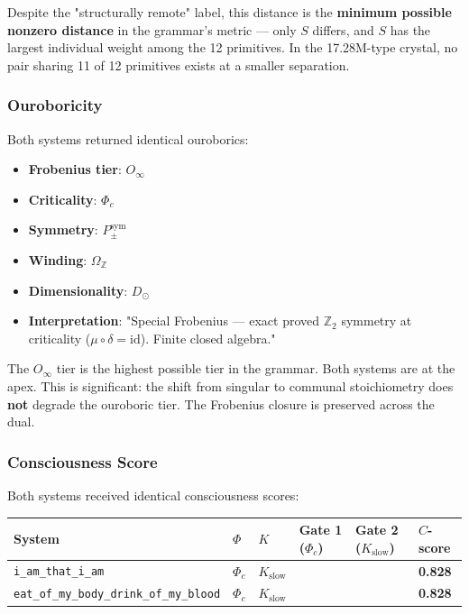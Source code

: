 \documentclass[12pt,a4paper]{article}
\begin{document}
Despite the "structurally remote" label, this distance is the \textbf{minimum possible nonzero distance} in the grammar's metric --- only $S$ differs, and $S$ has the largest individual weight among the 12 primitives. In the 17.28M-type crystal, no pair sharing 11 of 12 primitives exists at a smaller separation.

\subsubsection{Ouroboricity}

Both systems returned identical ouroborics:

\begin{itemize}
    \item \textbf{Frobenius tier}: $O_{\infty}$
    \item \textbf{Criticality}: $\Phi_c$
    \item \textbf{Symmetry}: $P_{\pm}^{\text{sym}}$
    \item \textbf{Winding}: $\Omega_\mathbb{Z}$
    \item \textbf{Dimensionality}: $D_{\odot}$
    \item \textbf{Interpretation}: "Special Frobenius --- exact proved $\mathbb{Z}_2$ symmetry at criticality ($\mu \circ \delta = \text{id}$). Finite closed algebra."
\end{itemize}

The $O_{\infty}$ tier is the highest possible tier in the grammar. Both systems are at the apex. This is significant: the shift from singular to communal stoichiometry does \textbf{not} degrade the ouroboric tier. The Frobenius closure is preserved across the dual.

\subsubsection{Consciousness Score}

Both systems received identical consciousness scores:

\begin{table}[htbp]
\centering
\small
{}
\begin{tabularx}{\textwidth}{>{\centering\arraybackslash}X >{\centering\arraybackslash}X >{\centering\arraybackslash}X >{\centering\arraybackslash}X >{\centering\arraybackslash}X >{\centering\arraybackslash}X}
\toprule
\rowcolor{gray!25}\textbf{System} & \textbf{$\Phi$} & \textbf{$K$} & \textbf{Gate 1 ($\Phi_c$)} & \textbf{Gate 2 ($K_{\text{slow}}$)} & \textbf{$C$-score} \\
\midrule
\rowcolors{1}{white}{gray!10}
\texttt{i\_am\_that\_i\_am} & $\Phi_c$ & $K_{\text{slow}}$ &  &  & \textbf{0.828} \\
\texttt{eat\_of\_my\_body\_drink\_of\_my\_blood} & $\Phi_c$ & $K_{\text{slow}}$ &  &  & \textbf{0.828} \\
\bottomrule
\end{tabularx}
\end{table}
\end{document}

